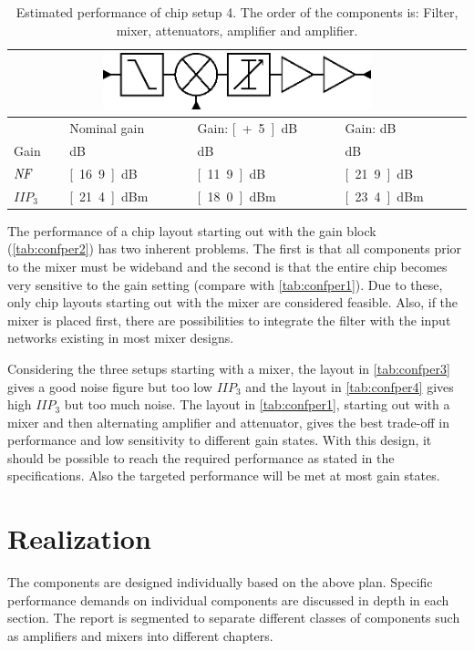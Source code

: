 		\begin{table}[hpt!]
			\caption[Estimated performance of chip setup 4.]{Estimated performance of chip setup 4. The order of the components is: Filter, mixer, attenuators, amplifier and amplifier.}
			\label{tab:confper4}
			\centering
			\begin{tabular}{ l l l l }
				\multicolumn{4}{c}{\includegraphics[width=0.6\textwidth]{fig/system/sys4}} \\\toprule
				& Nominal gain & Gain: \unit[+5]{dB} & Gain: \unit[-5]{dB} \\\midrule
				Gain & \unit[9]{dB} & \unit[14]{dB} & \unit[4]{dB} \\
				$\emph{NF}$ & \unit[16.9]{dB} & \unit[11.9]{dB} & \unit[21.9]{dB} \\
				$IIP_3$ & \unit[21.4]{dBm} & \unit[18.0]{dBm} & \unit[23.4]{dBm} \\\bottomrule
			\end{tabular}
		\end{table}

		The performance of a chip layout starting out with the gain block (\autoref{tab:confper2}) has two inherent problems. The first is that all components prior to the mixer must be wideband and the second is that the entire chip becomes very sensitive to the gain setting (compare with \autoref{tab:confper1}). Due to these, only chip layouts starting out with the mixer are considered feasible. Also, if the mixer is placed first, there are possibilities to integrate the filter with the input networks existing in most mixer designs.

		Considering the three setups starting with a mixer, the layout in \autoref{tab:confper3} gives a good noise figure but too low $IIP_3$ and the layout in \autoref{tab:confper4} gives high $IIP_3$ but too much noise. The layout in \autoref{tab:confper1}, starting out with a mixer and then alternating amplifier and attenuator, gives the best trade-off in performance and low sensitivity to different gain states. With this design, it should be possible to reach the required performance as stated in the specifications. Also the targeted performance will be met at most gain states.

	\section{Realization}
		The components are designed individually based on the above plan. Specific performance demands on individual components are discussed in depth in each section. The report is segmented to separate different classes of components such as amplifiers and mixers into different chapters.

